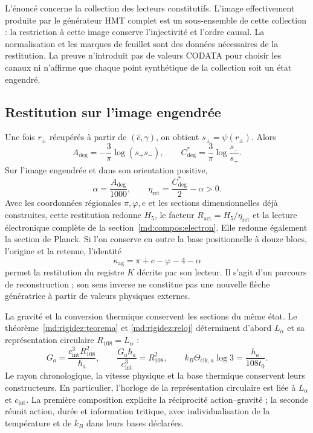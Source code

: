 L’énoncé concerne la collection des lecteurs constitutifs. L’image
effectivement produite par le générateur HMT complet est un sous-ensemble de
cette collection : la restriction à cette image conserve l’injectivité et l’ordre
causal. La normalisation et les marques de feuillet sont des données nécessaires de la
restitution. La preuve n’introduit pas de valeurs CODATA pour choisir les canaux ni
n’affirme que chaque point synthétique de la collection soit un état engendré.

\subsection{Restitution sur l’image engendrée}
\label{md:compos:restitucion-completa}

Une fois $r_\pm$ récupérés à partir de $(\widehat c,\gamma)$, on obtient
$s_\pm=\psi(r_\pm)$. Alors
\begin{equation}
 A_{\deg}=-\frac{3}{\pi}\log(s_+s_-),\qquad
 C^*_{\deg}=\frac{3}{\pi}\log\frac{s_-}{s_+}.
 \label{md:compos:restitucion-angular}
\end{equation}
Sur l’image engendrée et dans son orientation positive,
\begin{equation}
 \alpha=\frac{A_{\deg}}{1000},\qquad
 \eta_{\mathrm{ret}}=\frac{C^*_{\deg}}{2}-\alpha>0.
 \label{md:compos:restitucion-alpha-eta}
\end{equation}
Avec les coordonnées régionales $\pi,\varphi,e$ et les sections dimensionnelles
déjà construites, cette restitution redonne $H_5$, le facteur
$R_{\mathrm{act}}=H_5/\eta_{\mathrm{ret}}$ et la lecture électronique complète
de la section~\ref{md:compos:electron}. Elle redonne également la section de
Planck. Si l’on conserve en outre la base positionnelle à douze blocs, l’origine
et la retenue, l’identité
\begin{equation}
 \kappa_{\mathrm{ag}}=\pi+e-\varphi-4-\alpha
 \label{md:compos:restitucion-k}
\end{equation}
permet la restitution du registre $K$ décrite par son lecteur. Il s’agit
d’un parcours de reconstruction ; son sens inverse ne constitue pas une nouvelle
flèche génératrice à partir de valeurs physiques externes.

La gravité et la conversion thermique conservent les sections du même
état. Le théorème~\ref{md:rigidez:teorema} et
\eqref{md:rigidez:reloj} déterminent d’abord $L_\alpha$ et sa
représentation circulaire $R_{108}=L_\alpha$ :
\begin{equation}
 G_a=\frac{c_{\mathrm{int}}^3R_{108}^2}{\hbar_a},\qquad
 \frac{G_a\hbar_a}{c_{\mathrm{int}}^3}=R_{108}^2,
 \qquad
 k_B\Theta_{\mathrm{clk},a}\log3=\frac{h_a}{108t_0}.
 \label{md:compos:gravedad-termica}
\end{equation}
Le rayon chronologique, la vitesse physique et la base thermique conservent leurs
constructeurs. En particulier, l’horloge de la représentation circulaire est
liée à $L_\alpha$ et $c_{\mathrm{int}}$. La première
composition explicite la réciprocité action--gravité ; la seconde réunit
action, durée et information tritique, avec individualisation de la température
et de $k_B$ dans leurs bases déclarées.

